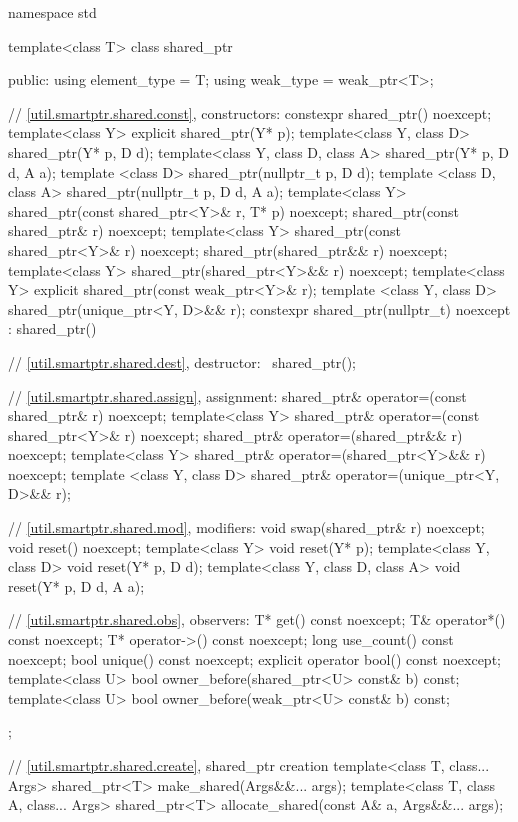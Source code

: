 \begin{codeblock}
namespace std {
  template<class T> class shared_ptr {
  public:
    using element_type = T;
    using weak_type    = weak_ptr<T>;

    // \ref{util.smartptr.shared.const}, constructors:
    constexpr shared_ptr() noexcept;
    template<class Y> explicit shared_ptr(Y* p);
    template<class Y, class D> shared_ptr(Y* p, D d);
    template<class Y, class D, class A> shared_ptr(Y* p, D d, A a);
    template <class D> shared_ptr(nullptr_t p, D d);
    template <class D, class A> shared_ptr(nullptr_t p, D d, A a);
    template<class Y> shared_ptr(const shared_ptr<Y>& r, T* p) noexcept;
    shared_ptr(const shared_ptr& r) noexcept;
    template<class Y> shared_ptr(const shared_ptr<Y>& r) noexcept;
    shared_ptr(shared_ptr&& r) noexcept;
    template<class Y> shared_ptr(shared_ptr<Y>&& r) noexcept;
    template<class Y> explicit shared_ptr(const weak_ptr<Y>& r);
    template <class Y, class D> shared_ptr(unique_ptr<Y, D>&& r);
    constexpr shared_ptr(nullptr_t) noexcept : shared_ptr() { }

    // \ref{util.smartptr.shared.dest}, destructor:
    ~shared_ptr();

    // \ref{util.smartptr.shared.assign}, assignment:
    shared_ptr& operator=(const shared_ptr& r) noexcept;
    template<class Y> shared_ptr& operator=(const shared_ptr<Y>& r) noexcept;
    shared_ptr& operator=(shared_ptr&& r) noexcept;
    template<class Y> shared_ptr& operator=(shared_ptr<Y>&& r) noexcept;
    template <class Y, class D> shared_ptr& operator=(unique_ptr<Y, D>&& r);

    // \ref{util.smartptr.shared.mod}, modifiers:
    void swap(shared_ptr& r) noexcept;
    void reset() noexcept;
    template<class Y> void reset(Y* p);
    template<class Y, class D> void reset(Y* p, D d);
    template<class Y, class D, class A> void reset(Y* p, D d, A a);

    // \ref{util.smartptr.shared.obs}, observers:
    T* get() const noexcept;
    T& operator*() const noexcept;
    T* operator->() const noexcept;
    long use_count() const noexcept;
    bool unique() const noexcept;
    explicit operator bool() const noexcept;
    template<class U> bool owner_before(shared_ptr<U> const& b) const;
    template<class U> bool owner_before(weak_ptr<U> const& b) const;
  };

  // \ref{util.smartptr.shared.create}, shared_ptr creation
  template<class T, class... Args> shared_ptr<T> make_shared(Args&&... args);
  template<class T, class A, class... Args>
    shared_ptr<T> allocate_shared(const A& a, Args&&... args);

}
\end{codeblock}
